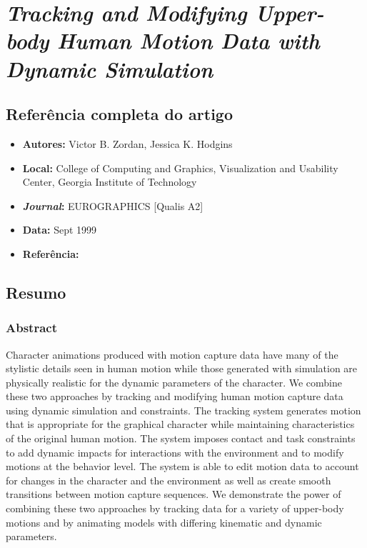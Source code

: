 \section{\textit{Tracking and Modifying Upper-body Human Motion Data with Dynamic Simulation}}

\subsection{Referência completa do artigo}

\begin{itemize}
  \item \textbf{Autores:} Victor B. Zordan, Jessica K. Hodgins
  \item \textbf{Local:} College of Computing and Graphics, Visualization and Usability Center, Georgia Institute of Technology
  \item \textbf{\textit{Journal}:} EUROGRAPHICS [Qualis A2]
  \item \textbf{Data:} Sept 1999
  \item \textbf{Referência:} 
\end{itemize}


\subsection{Resumo}

\subsubsection{Abstract}
Character animations produced with motion capture data have many of the stylistic details seen in human motion while those generated with simulation are physically realistic for the dynamic parameters of the character. We combine these two approaches by tracking and modifying human motion capture data using dynamic simulation and constraints. The tracking system generates motion that is appropriate for the graphical character while maintaining characteristics of the original human motion. The system imposes contact and task constraints to add dynamic impacts for interactions with the environment and to modify motions at the behavior level. The system is able to edit motion data to account for changes in the character and the environment as well as create smooth transitions between motion capture sequences. We demonstrate the power of combining these two approaches by tracking data for a variety of upper-body motions and by animating models with differing kinematic and dynamic parameters.

